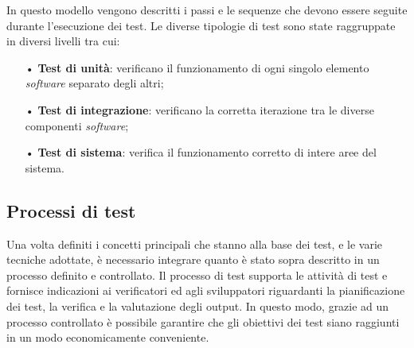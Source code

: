 In questo modello vengono descritti i passi e le sequenze che devono essere seguite durante l'esecuzione dei test. Le diverse tipologie di test sono state raggruppate in diversi livelli tra cui:
\begin{itemize}
\item[•] \textbf{Test di unità}: verificano il funzionamento di ogni singolo elemento \textit{software} separato degli altri;

\item[•] \textbf{Test di integrazione}: verificano la corretta iterazione tra le diverse componenti \textit{software};

\item[•] \textbf{Test di sistema}: verifica il funzionamento corretto di intere aree del sistema.
\end{itemize}

\subsection{Processi di test}

Una volta definiti i concetti principali che stanno alla base dei test, e le varie tecniche adottate, è necessario integrare quanto è stato sopra descritto in un processo definito e controllato. Il processo di test supporta le attività di test e fornisce indicazioni ai verificatori ed agli sviluppatori riguardanti la pianificazione dei test, la verifica e la valutazione degli output. In questo modo, grazie ad un processo controllato è possibile garantire che gli obiettivi dei test siano raggiunti in un modo economicamente conveniente.

